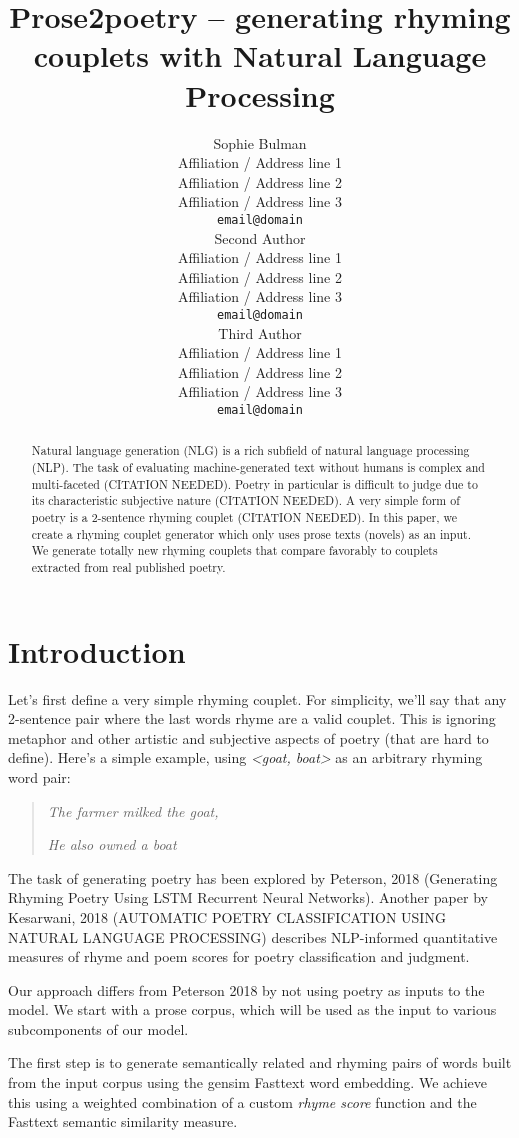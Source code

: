 \documentclass[11pt,a4paper]{article}
\title{Prose2poetry -- generating rhyming couplets with Natural Language Processing}
\author{Sophie Bulman \\
  Affiliation / Address line 1 \\
  Affiliation / Address line 2 \\
  Affiliation / Address line 3 \\
  \texttt{email@domain} \\\And
  Second Author \\
  Affiliation / Address line 1 \\
  Affiliation / Address line 2 \\
  Affiliation / Address line 3 \\
  \texttt{email@domain} \\\And
  Third Author \\
  Affiliation / Address line 1 \\
  Affiliation / Address line 2 \\
  Affiliation / Address line 3 \\
  \texttt{email@domain} \\}
\date{}
\begin{document}
\maketitle
\begin{abstract}
	Natural language generation (NLG) is a rich subfield of natural language processing (NLP). The task of evaluating machine-generated text without humans is complex and multi-faceted (CITATION NEEDED). Poetry in particular is difficult to judge due to its characteristic subjective nature (CITATION NEEDED). A very simple form of poetry is a 2-sentence rhyming couplet (CITATION NEEDED). In this paper, we create a rhyming couplet generator which only uses prose texts (novels) as an input. We generate totally new rhyming couplets that compare favorably to couplets extracted from real published poetry.
\end{abstract}

\section{Introduction}

Let's first define a very simple rhyming couplet. For simplicity, we'll say that any 2-sentence pair where the last words rhyme are a valid couplet. This is ignoring metaphor and other artistic and subjective aspects of poetry (that are hard to define). Here's a simple example, using \textit{<goat, boat>} as an arbitrary rhyming word pair:

\begin{quote}
	\textit{The farmer milked the goat,}

	\textit{He also owned a boat}
\end{quote}


The task of generating poetry has been explored by Peterson, 2018 (Generating Rhyming Poetry Using LSTM Recurrent Neural Networks). Another paper by Kesarwani, 2018 (AUTOMATIC POETRY CLASSIFICATION USING NATURAL LANGUAGE PROCESSING) describes NLP-informed quantitative measures of rhyme and poem scores for poetry classification and judgment.

Our approach differs from Peterson 2018 by not using poetry as inputs to the model. We start with a prose corpus, which will be used as the input to various subcomponents of our model.

The first step is to generate semantically related and rhyming pairs of words built from the input corpus using the gensim Fasttext word embedding. We achieve this using a weighted combination of a custom \textit{rhyme score} function and the Fasttext semantic similarity measure.
\end{document}
